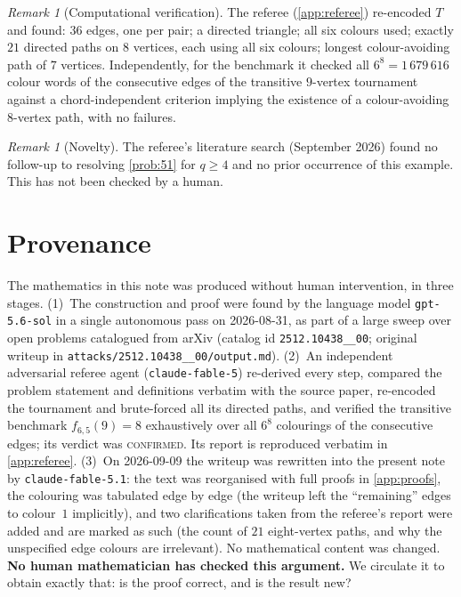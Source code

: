 \documentclass[11pt,a4paper]{article}
\theoremstyle{plain}
\theoremstyle{definition}
\theoremstyle{remark}
\newtheorem{remark}[theorem]{Remark}
\begin{document}
\begin{remark}[Computational verification]
The referee (\cref{app:referee}) re-encoded $T$ and found: $36$ edges, one per pair; a directed triangle; all six colours used; exactly $21$ directed paths on $8$ vertices, each using all six colours; longest colour-avoiding path of $7$ vertices. Independently, for the benchmark it checked all $6^8=1\,679\,616$ colour words of the consecutive edges of the transitive $9$-vertex tournament against a chord-independent criterion implying the existence of a colour-avoiding $8$-vertex path, with no failures.
\end{remark}

\begin{remark}[Novelty]
The referee's literature search (September 2026) found no follow-up to \cite{FSW25} resolving \cref{prob:51} for $q\ge4$ and no prior occurrence of this example. This has not been checked by a human.
\end{remark}

\section{Provenance}\label{sec:provenance}

The mathematics in this note was produced without human intervention, in three stages.
(1)~The construction and proof were found by the language model \texttt{gpt-5.6-sol} in a single autonomous pass on 2026-08-31, as part of a large sweep over open problems catalogued from arXiv (catalog id \texttt{2512.10438\_\_00}; original writeup in \texttt{attacks/2512.10438\_\_00/output.md}).
(2)~An independent adversarial referee agent (\texttt{claude-fable-5}) re-derived every step, compared the problem statement and definitions verbatim with the source paper, re-encoded the tournament and brute-forced all its directed paths, and verified the transitive benchmark $f_{6,5}(9)=8$ exhaustively over all $6^8$ colourings of the consecutive edges; its verdict was \textsc{confirmed}. Its report is reproduced verbatim in \cref{app:referee}.
(3)~On 2026-09-09 the writeup was rewritten into the present note by \texttt{claude-fable-5.1}: the text was reorganised with full proofs in \cref{app:proofs}, the colouring was tabulated edge by edge (the writeup left the ``remaining'' edges to colour~$1$ implicitly), and two clarifications taken from the referee's report were added and are marked as such (the count of $21$ eight-vertex paths, and why the unspecified edge colours are irrelevant). No mathematical content was changed.
\textbf{No human mathematician has checked this argument.} We circulate it to obtain exactly that: is the proof correct, and is the result new?
\end{document}
